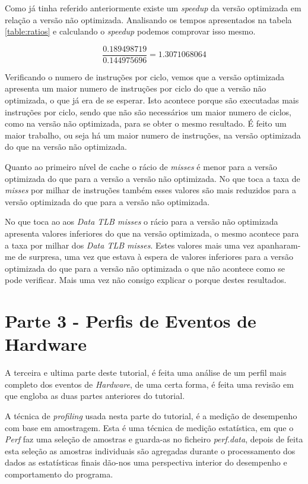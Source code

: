 \documentclass[conference,compsoc]{IEEEtran}
\begin{document}
Como já tinha referido anteriormente existe um \textit{speedup} da versão optimizada em relação a versão não optimizada. Analisando os tempos apresentados na tabela \ref{table:ratios} e calculando o \textit{speedup} podemos comprovar isso mesmo. 

\begin{equation}
	\frac{0.189498719}{0.144975696} = 1.3071068064
\end{equation}

Verificando o numero de instruções por ciclo, vemos que a versão optimizada apresenta um maior numero de instruções por ciclo do que a versão não optimizada, o que já era de se esperar. Isto acontece porque são executadas mais instruções por ciclo, sendo que não são necessários um maior numero de ciclos, como na versão não optimizada, para se obter o mesmo resultado. É feito um maior trabalho, ou seja há um maior numero de instruções, na versão optimizada do que na versão não optimizada.

Quanto ao primeiro nível de cache o rácio de \textit{misses} é menor para a versão optimizada do que para a versão a versão não optimizada. No que toca a taxa de \textit{misses} por milhar de instruções também esses valores são mais reduzidos para a versão optimizada do que para a versão não optimizada.

No que toca ao aos \textit{Data TLB misses} o rácio para a versão não optimizada apresenta valores inferiores do que na versão optimizada, o mesmo acontece para a taxa por milhar dos \textit{Data TLB misses}. Estes valores mais uma vez apanharam-me de surpresa, uma vez que estava à espera de valores inferiores para a versão optimizada do que para a versão não optimizada o que não acontece como se pode verificar. Mais uma vez não consigo explicar o porque destes resultados.

\section{Parte 3 - Perfis de Eventos de Hardware}

A terceira e ultima parte deste tutorial, é feita uma análise de um perfil mais completo dos eventos de \textit{Hardware}, de uma certa forma, é feita uma revisão em que engloba as duas partes anteriores do tutorial.

A técnica de \textit{profiling} usada nesta parte do tutorial, é a medição de desempenho com base em amostragem. Esta é uma técnica de medição estatística, em que o \textit{Perf} faz uma seleção de amostras e guarda-as no ficheiro \textit{perf.data}, depois de feita esta seleção as amostras individuais são agregadas durante o processamento dos dados as estatísticas finais dão-nos uma perspectiva interior do desempenho e comportamento do programa.
\end{document}

